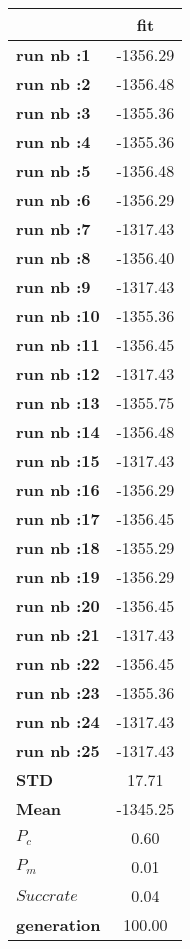 \begin{tiny}\begin{tabular}{|l|c|}
\hline
&\textbf{fit}\\\hline
\textbf{run nb :1}&-1356.29\\\hline
\textbf{run nb :2}&-1356.48\\\hline
\textbf{run nb :3}&-1355.36\\\hline
\textbf{run nb :4}&-1355.36\\\hline
\textbf{run nb :5}&-1356.48\\\hline
\textbf{run nb :6}&-1356.29\\\hline
\textbf{run nb :7}&-1317.43\\\hline
\textbf{run nb :8}&-1356.40\\\hline
\textbf{run nb :9}&-1317.43\\\hline
\textbf{run nb :10}&-1355.36\\\hline
\textbf{run nb :11}&-1356.45\\\hline
\textbf{run nb :12}&-1317.43\\\hline
\textbf{run nb :13}&-1355.75\\\hline
\textbf{run nb :14}&-1356.48\\\hline
\textbf{run nb :15}&-1317.43\\\hline
\textbf{run nb :16}&-1356.29\\\hline
\textbf{run nb :17}&-1356.45\\\hline
\textbf{run nb :18}&-1355.29\\\hline
\textbf{run nb :19}&-1356.29\\\hline
\textbf{run nb :20}&-1356.45\\\hline
\textbf{run nb :21}&-1317.43\\\hline
\textbf{run nb :22}&-1356.45\\\hline
\textbf{run nb :23}&-1355.36\\\hline
\textbf{run nb :24}&-1317.43\\\hline
\textbf{run nb :25}&-1317.43\\\hline
\textbf{STD}&17.71\\\hline
\textbf{Mean}&-1345.25\\\hline
\textbf{$P_c$}&0.60\\\hline
\textbf{$P_{m}$}&0.01\\\hline
\textbf{$Succ rate$}&0.04\\\hline
\textbf{generation}&100.00\\\hline
\end{tabular}
\end{tiny}